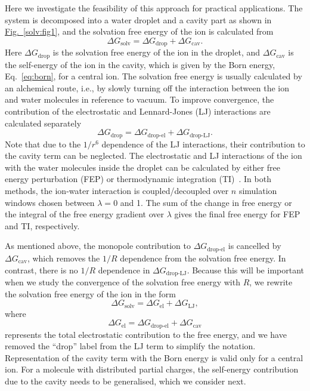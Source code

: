 Here we investigate the feasibility of this approach for practical applications. The system is decomposed 
into a water droplet and a cavity part as shown in \hyperref[solv:fig1]{Fig.~\ref{solv:fig1}}, and the solvation free energy of the ion is calculated from
\begin{equation}
\Delta G_{\text{solv}} = \Delta G_{\text{drop}} + \Delta G_{\text{cav}}.
\label{eq:solvation}
\end{equation}
Here $\Delta G_{\text{drop}}$ is the solvation free energy of the ion in the droplet, and $\Delta G_{\text{cav}}$ 
is the self-energy of the ion in the cavity, which is given by the Born energy, Eq.~\eqref{eq:born}, 
for a central ion.  The solvation free energy is usually calculated by an alchemical route, i.e., by 
slowly turning off the interaction between the ion and water molecules in reference to vacuum. To 
improve convergence, the contribution of the electrostatic and Lennard-Jones (LJ) interactions are 
calculated separately
\begin{equation}
\Delta G_{\text{drop}} = \Delta G_{\text{drop-el}} + \Delta G_{\text{drop-LJ}} .
\end{equation}
Note that due to the $1/r^6$ dependence of the LJ interactions, their contribution to the cavity term 
can be neglected. The electrostatic and LJ interactions of the ion with the water molecules inside the 
droplet can be calculated by either free energy perturbation (FEP) or thermodynamic integration 
(TI)~\cite{Chipot2007}. In both methods, the ion-water interaction is coupled/decoupled over $n$ 
simulation windows chosen between $\lambda=0$ and 1. The sum of the change in free energy or the 
integral of the free energy gradient over $\lambda$ gives the final free energy for FEP and TI, 
respectively. 

As mentioned above, the monopole contribution to $\Delta G_{\text{drop-el}}$ is cancelled by 
$\Delta G_{\text{cav}}$, which removes the $1/R$ dependence from the solvation free energy. In 
contrast, there is no $1/R$ dependence in $\Delta G_{\text{drop-LJ}}$. Because this will be important 
when we study the convergence of the solvation free energy with $R$, we rewrite the solvation free 
energy of the ion in the form
\begin{equation}
\Delta G_{\text{solv}} = \Delta G_{\text{el}} + \Delta G_{\text{LJ}} ,
\end{equation}
where 
\begin{equation}
\Delta G_{\text{el}} = \Delta G_{\text{drop-el}} + \Delta G_{\text{cav}}
\label{eq:split}
\end{equation}
represents the total electrostatic contribution to the free energy, and we have removed the ``drop'' 
label from the LJ term to simplify the notation. Representation of the cavity term with the Born energy 
is valid only for a central ion. For a molecule with distributed partial charges, the self-energy 
contribution due to the cavity needs to be generalised, which we consider next.

